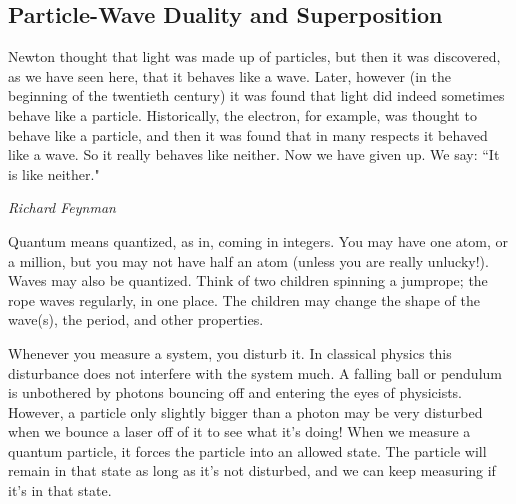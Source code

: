 \subsection{Particle-Wave Duality and Superposition}


\epigraph{
Newton thought that light was made up of particles, but then it was discovered, as we have seen here, that it behaves like a wave. Later, however (in the beginning of the twentieth century) it was found that light did indeed sometimes behave like a particle. Historically, the electron, for example, was thought to behave like a particle, and then it was found that in many respects it behaved like a wave. So it really behaves like neither. Now we have given up. We say: “It is like neither."
}
{\textit{Richard Feynman}}

Quantum means quantized, as in, coming in integers. 
You may have one atom, or a million, but you may not
have half an atom (unless you are really unlucky!).
Waves may also be quantized. Think of two children 
spinning a jumprope; the rope waves regularly, in 
one place. The children may change 
the shape of the wave(s), the period, and other
properties.

Whenever you measure a system, you disturb it. 
In classical physics this disturbance does not 
interfere with the system much. A falling ball 
or pendulum is unbothered by photons bouncing off 
and entering the eyes of physicists. However, a 
particle only slightly bigger than a photon may 
be very disturbed when we bounce a laser off of it 
to see what it's doing! When we measure a quantum 
particle, it forces the particle into an 
allowed state. The particle will remain in that 
state as long as it's not disturbed, and we can keep 
measuring if it's in that state.